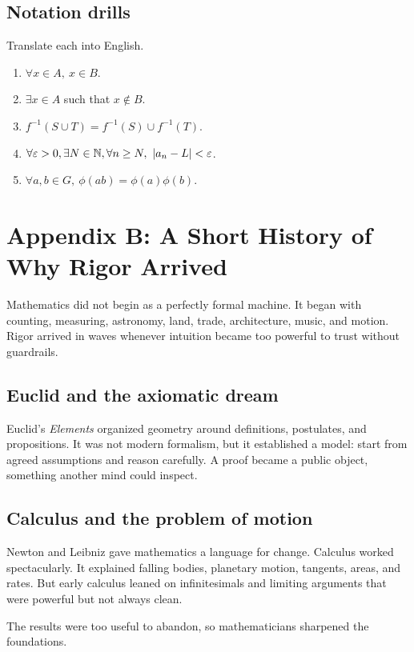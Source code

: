 \documentclass[11pt]{article}
\begin{document}
\subsection{Notation drills}

Translate each into English.

\begin{enumerate}
\item $\forall x\in A,\ x\in B$.
\item $\exists x\in A$ such that $x\notin B$.
\item $f^{-1}(S\cup T)=f^{-1}(S)\cup f^{-1}(T)$.
\item $\forall \varepsilon>0,\exists N\in\mathbb{N},\forall n\geq N,\ |a_n-L|<\varepsilon$.
\item $\forall a,b\in G,\ \phi(ab)=\phi(a)\phi(b)$.
\end{enumerate}

\newpage
\section{Appendix B: A Short History of Why Rigor Arrived}

Mathematics did not begin as a perfectly formal machine. It began with counting, measuring, astronomy, land, trade, architecture, music, and motion. Rigor arrived in waves whenever intuition became too powerful to trust without guardrails.

\subsection{Euclid and the axiomatic dream}

Euclid's \emph{Elements} organized geometry around definitions, postulates, and propositions. It was not modern formalism, but it established a model: start from agreed assumptions and reason carefully. A proof became a public object, something another mind could inspect.

\subsection{Calculus and the problem of motion}

Newton and Leibniz gave mathematics a language for change. Calculus worked spectacularly. It explained falling bodies, planetary motion, tangents, areas, and rates. But early calculus leaned on infinitesimals and limiting arguments that were powerful but not always clean.

The results were too useful to abandon, so mathematicians sharpened the foundations.
\end{document}

